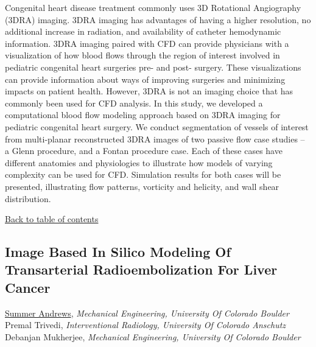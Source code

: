 \noindent Congenital heart disease treatment commonly uses 3D Rotational Angiography (3DRA) imaging. 3DRA imaging has advantages of having a higher resolution, no additional increase in radiation, and availability of catheter hemodynamic information. 3DRA imaging paired with CFD can provide physicians with a visualization of how blood flows through the region of interest involved in pediatric congenital heart surgeries pre- and post- surgery. These visualizations can provide information about ways of improving surgeries and minimizing impacts on patient health. However, 3DRA is not an imaging choice that has commonly been used for CFD analysis. In this study, we developed a computational blood flow modeling approach based on 3DRA imaging for pediatric congenital heart surgery. We conduct segmentation of vessels of interest from multi-planar reconstructed 3DRA images of two passive flow case studies – a Glenn procedure, and a Fontan procedure case. Each of these cases have different anatomies and physiologies to illustrate how models of varying complexity can be used for CFD. Simulation results for both cases will be presented, illustrating flow patterns, vorticity and helicity, and wall shear distribution.  \\ 
\begin{flushright}\vspace{-0.2 in}\hyperlink{toc}{Back to table of contents}\end{flushright}\vspace{-0.2 in}
\hypertarget{SummerAndrews}{\subsection*{\color{CUGOLD} Image Based In Silico Modeling Of Transarterial Radioembolization For Liver Cancer}} \vsp 
\underline{Summer Andrews}, \textit{Mechanical Engineering, University Of Colorado Boulder}\\ 
{Premal Trivedi}, \textit{Interventional Radiology, University Of Colorado Anschutz}\\ 
{Debanjan Mukherjee}, \textit{Mechanical Engineering, University Of Colorado Boulder}\\ 
\vspace{-0.1 in} \\ 
